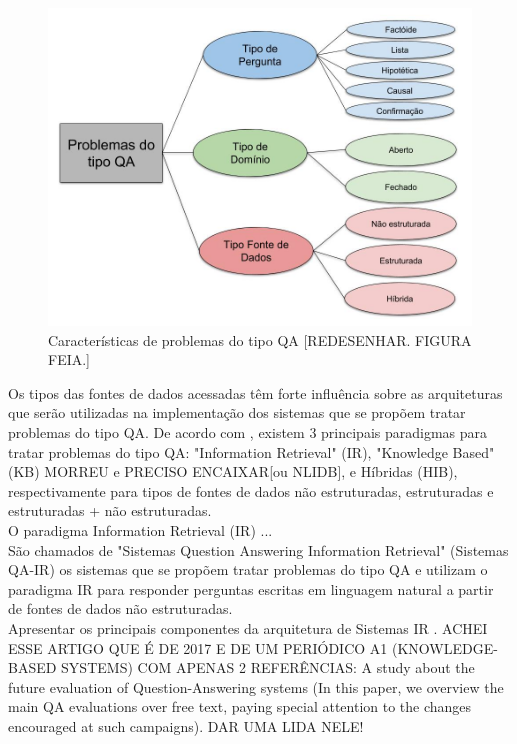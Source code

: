 \documentclass{article}
\begin{document}
\begin{figure}[h!]
\centering
\includegraphics[scale=0.3]{SistemaQA2.jpg}
\caption{Características de problemas do tipo QA [REDESENHAR. FIGURA FEIA.]}
\label{fig:SistemaQA}
\end{figure}

Os tipos das fontes de dados acessadas têm forte influência sobre as arquiteturas que serão utilizadas na implementação dos sistemas que se propõem tratar problemas do tipo QA. De acordo com \citep{speech}, existem 3 principais paradigmas para tratar problemas do tipo QA: "Information Retrieval" (IR), "Knowledge Based" (KB) MORREU e PRECISO ENCAIXAR[ou NLIDB], e Híbridas (HIB), respectivamente para tipos de fontes de dados não estruturadas, estruturadas e estruturadas + não estruturadas.\\

O paradigma Information Retrieval (IR) ...\\

São chamados de "Sistemas Question Answering Information Retrieval" (Sistemas QA-IR) os sistemas que se propõem tratar problemas do tipo QA e utilizam o paradigma IR para responder perguntas escritas em linguagem natural a partir de fontes de dados não estruturadas.\\

Apresentar os principais componentes da arquitetura de Sistemas IR \citep{kolomiyets2011survey}. ACHEI ESSE ARTIGO QUE É DE 2017 E DE UM PERIÓDICO A1 (KNOWLEDGE-BASED SYSTEMS) COM APENAS 2 REFERÊNCIAS: A study about the future evaluation of Question-Answering systems (In this paper, we overview the main QA evaluations over free text, paying special attention to the changes encouraged at such campaigns). DAR UMA LIDA NELE!\\
\end{document}
